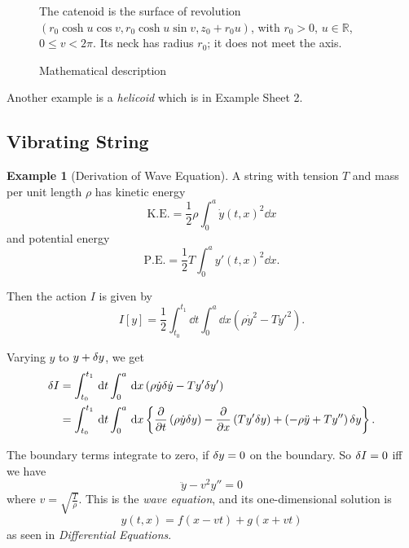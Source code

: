 \documentclass[11pt]{article}
\numberwithin{equation}{section}
\theoremstyle{definition}
\newtheorem{example}[theorem]{Example}
\theoremstyle{remark}
\newcommand{\pqty}[1]{\left(#1\right)}
\newcommand{\bqty}[1]{\left[#1\right]}
\newcommand{\Bqty}[1]{\left\{#1\right\}}
\newcommand{\flatfrac}[2]{\frac{#1}{#2}}
\newcommand{\RR}{\mathbb{R}}
\begin{document}
\begin{figure}[ht!]\centering\begin{minipage}{.94\linewidth}The catenoid is the surface of revolution \((r_0\cosh u\cos v,r_0\cosh u\sin v,z_0+r_0u)\), with \(r_0>0\), \(u\in\RR\), \(0\le v<2\pi\). Its neck has radius \(r_0\); it does not meet the axis.\end{minipage}\caption{Mathematical description}\label{fig:catenoid}\end{figure}

Another example is a \emph{helicoid} which is in Example Sheet 2.

\subsection{Vibrating String}

\begin{example}[Derivation of Wave Equation]\label{variation-unit-0087}
    A string with tension \(T\) and mass per unit length \(\rho\) has kinetic energy
    \[
        \text{K.E.} = \frac{1}{2} \rho \int_{0}^{a} \dot{y} \pqty{t, x}^2 \dd{x}
    \]
    and potential energy
    \[
        \text{P.E.} = \frac{1}{2} T \int_{0}^{a} y' \pqty{t, x}^2 \dd{x}.
    \]
    
    Then the action \(I\) is given by
    \begin{equation}
        I \bqty{y} = \frac{1}{2} \int_{t_0}^{t_1} \dd{t} \int_{0}^{a} \dd{x} \pqty{\rho \dot{y}^2 - T y'^2}.
    \end{equation}
    
    Varying \(y\) to \(y + \var{y}\), we get
    \begin{align*}
        \var{I} &= \int_{t_0}^{t_1} \dd{t} \int_{0}^{a} \dd{x} \pqty{\rho \dot{y} \var{\dot{y}} - T y' \var{y}'} \\
        &= \int_{t_0}^{t_1} \dd{t} \int_{0}^{a} \dd{x} \Bqty{\pdv{t} \pqty{\rho \dot{y} \var{y}} - \pdv{x} \pqty{T y' \var{y}} + \pqty{- \rho \ddot{y} + T y''} \var{y}}.
    \end{align*}
    
    The boundary terms integrate to zero, if \(\var{y} = 0\) on the boundary. So \(\var{I} = 0\) iff we have
    \[
        \ddot{y} - v^2 y'' = 0
    \]
    where \(v = \sqrt{\flatfrac{T}{\rho}}\). This is the \emph{wave equation}, and its one-dimensional solution is
    \[
        y\pqty{t, x} = f \pqty{x - vt} + g \pqty{x + vt}
    \]
    as seen in \textit{Differential Equations}.
\end{example}
\end{document}
